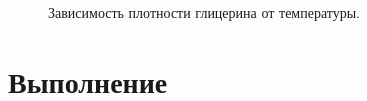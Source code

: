 \documentclass[a4paper,12pt]{article}
\begin{document}
	\begin{figure}[h!]
		\caption[]{\label{fig:2} Зависимость плотности  глицерина от температуры.}
	\end{figure}
	
	\newpage
	
	\section{Выполнение}
\end{document}
